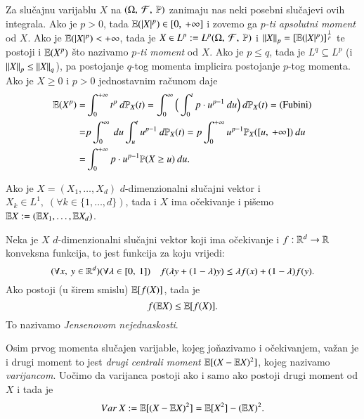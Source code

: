 Za slu\v cajnu varijablu $X$ na $(\Omega, \: \mathcal{F}, \: \mathbb{P})$ zanimaju nas neki posebni slu\v cajevi ovih integrala.
Ako je $p > 0$, tada $\mathbb{E}({|X|^p}) \in [{0}, \:{+\infty}]$ i zovemo ga \emph{$p$-ti apsolutni moment} od $X$.
Ako je $\mathbb{E}({|X|^p}) < +\infty$, tada je $X \in L^p := L^p (\Omega, \: \mathcal{F}, \: \mathbb{P})$ i $\left\lVert {X} \right\rVert_p = [\mathbb{E}({|X|^p})]^{\frac{1}{p}}$ te postoji i $\mathbb{E}({X^p})$ \v sto nazivamo \emph{$p$-ti moment} od $X$.
Ako je $p \leq q$, tada je $L^q \subseteq L^p$ (i $\left\lVert {X} \right\rVert_p \leq \left\lVert {X} \right\rVert_q$), pa postojanje $q$-tog momenta implicira postojanje $p$-tog momenta.
Ako je $X \geq 0$ i $p > 0$ jednostavnim ra\v cunom daje
\begin{align}   \label{jed:5.12}
    \begin{split}
        \mathbb{E}({X^p}) =& \int_0^{+\infty} t^p \: d \mathbb{P}_X (t) = \int_0^{\infty} \Big( \int_0^t p \cdot u^{p - 1} \: d u \Big) \: d \mathbb{P}_X(t) = (\textnormal{Fubini})\\
        =& p \int_0^{\infty} \: du \int_u^t u ^{p-1} \: d \mathbb{P}_X (t) = p \int_0^{+\infty} u^{p-1} \mathbb{P}_X ([{u}, \:{+\infty}]) \: du \\
        =& \int_0^{+\infty} p \cdot u^{p-1} \mathbb{P}({X \geq u}) \: du.
    \end{split}
\end{align}

Ako je $X = (X_1, \ldots, X_d)$ $d$-dimenzionalni slu\v cajni vektor i $X_k \in L^1, \; (\forall k \in \{1, \ldots, d\})$, tada i $X$ ima o\v cekivanje i pi\v semo $\mathbb{E} X := (\mathbb{E} X_1, \ldots, \mathbb{E} X_d)$.

\begin{zad} \label{zad:5.13}
    Neka je $X$ $d$-dimenzionalni slu\v cajni vektor koji ima o\v cekivanje i $f: \mathbb{R}^d \to \mathbb{R}$ konveksna funkcija, to jest funkcija za koju vrijedi:
    \begin{equation*}
        (\forall x, \: y \in \mathbb{R}^d)(\forall \lambda \in [{0}, \:{1}]) \quad f (\lambda y + (1 - \lambda) y) \leq \lambda f(x) + (1 - \lambda) f(y).
    \end{equation*}
    Ako  postoji (u \v sirem smislu) $\mathbb{E} [ f(X) ]$, tada je
    \begin{equation*}
        f (\mathbb{E} X) \leq \mathbb{E} [ f(X) ].
    \end{equation*}
    To nazivamo \emph{Jensenovom nejednaskosti}.
\end{zad}

Osim prvog momenta slu\v cajen varijable, kojeg jo\v nazivamo i o\v cekivanjem, va\v zan je i drugi moment to jest \emph{drugi centrali moment} $\mathbb{E} [ (X - \mathbb{E} X)^2 ]$, kojeg nazivamo \emph{varijancom}.
Uo\v cimo da varijanca postoji ako i samo ako postoji drugi moment od $X$ i tada je
\begin{equation*}
    Var \: X := \mathbb{E} [ (X - \mathbb{E} X)^2 ] = \mathbb{E} [ X^2 ] - (\mathbb{E} X)^2.
\end{equation*}